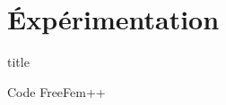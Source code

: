 \documentclass[french]{beamer}
\begin{document}
  \section{Éxpérimentation}
  \begin{frame}
    \vfill
    \centering
    \begin{beamercolorbox}[sep=8pt,center,shadow=true,rounded=true]{title}
      \insertsectionhead
    \end{beamercolorbox}
    \vfill
  \end{frame}

  \begin{frame}{Code FreeFem++}
  \end{frame}

  
\end{document}
